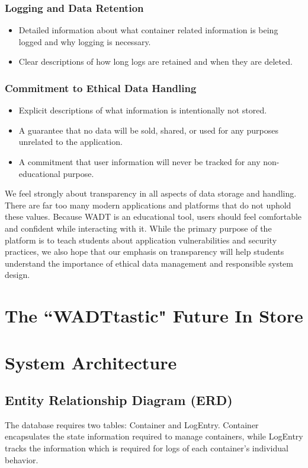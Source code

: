 \documentclass[12pt,titlepage]{article}
\begin{document}
\subsubsection{Logging and Data Retention}
\begin{itemize}
	\item Detailed information about what container related information is being logged and why logging is necessary.
	\item Clear descriptions of how long logs are retained and when they are deleted.
\end{itemize}

\subsubsection{Commitment to Ethical Data Handling}
\begin{itemize}
	\item Explicit descriptions of what information is intentionally not stored.
	\item A guarantee that no data will be sold, shared, or used for any purposes unrelated to the application.
	\item A commitment that user information will never be tracked for any non-educational purpose.
\end{itemize}

We feel strongly about transparency in all aspects of data storage and handling. There are far too many modern applications and platforms that do not uphold these values. Because WADT is an educational tool, users should feel comfortable and confident while interacting with it. While the primary purpose of the platform is to teach students about application vulnerabilities and security practices, we also hope that our emphasis on transparency will help students understand the importance of ethical data management and responsible system design.

\section{The ``WADTtastic" Future In Store}



\section{System Architecture}

\subsection{Entity Relationship Diagram (ERD)}
The database requires two tables: Container and LogEntry. Container encapsulates the state information required to manage containers, while LogEntry tracks the information which is required for logs of each container's individual behavior.
\end{document}
